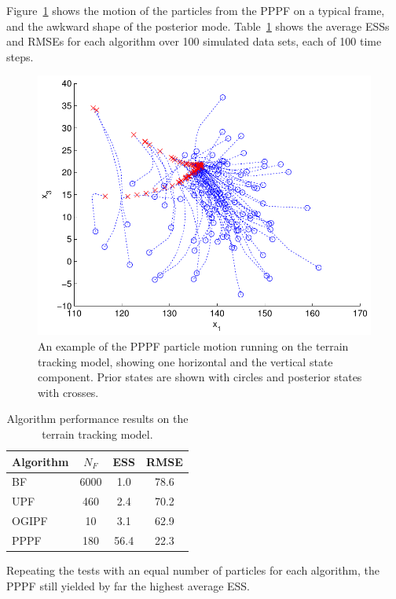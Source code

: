 \documentclass[conference]{IEEEtran}
\begin{document}
Figure~\ref{fig:drone_example_frame} shows the motion of the particles from the PPPF on a typical frame, and the awkward shape of the posterior mode. Table~\ref{tab:drone_results_gaussian} shows the average ESSs and RMSEs for each algorithm over 100 simulated data sets, each of 100 time steps.
%
\begin{figure}
\centering
\includegraphics[width=0.7\columnwidth]{drone_example_frame_deter.pdf}
\caption{An example of the PPPF particle motion running on the terrain tracking model, showing one horizontal and the vertical state component. Prior states are shown with circles and posterior states with crosses.}
\label{fig:drone_example_frame}
\end{figure}
%
\begin{table}
\renewcommand{\arraystretch}{1.3}
\centering
\caption{Algorithm performance results on the terrain tracking model.}
\begin{tabular}{l||c|c|c}
Algorithm                                & $N_F$ & ESS  & RMSE \\
\hline
BF                                       &  6000 &  1.0 & 78.6 \\
UPF                                      &   460 &  2.4 & 70.2 \\
OGIPF                                    &    10 &  3.1 & 62.9 \\
PPPF                                     &   180 & 56.4 & 22.3 \\
\end{tabular}
\label{tab:drone_results_gaussian}
\end{table}

Repeating the tests with an equal number of particles for each algorithm, the PPPF still yielded by far the highest average ESS.
\end{document}
